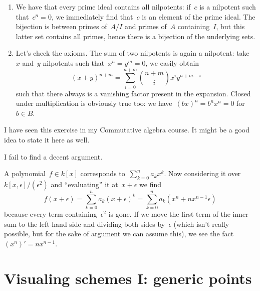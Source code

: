 \begin{exercise}
  \label{exercise:42o}
  \begin{enumerate}
    \item We have that every prime ideal contains all nilpotents: if~$c$ is a nilpotent such that~$c^n=0$, we immediately find that~$c$ is an element of the prime ideal. The bijection is between primes of~$A/I$ and primes of~$A$ containing~$I$, but this latter set contains all primes, hence there is a bijection of the underlying sets.

    \item\label{enumerate:42o-b} Let's check the axioms. The sum of two nilpotents is again a nilpotent: take~$x$ and~$y$ nilpotents such that~$x^n=y^m=0$, we easily obtain
      \begin{equation}
        (x+y)^{n+m}=\sum_{i=0}^{n+m}\binom{n+m}{i}x^iy^{n+m-i}
      \end{equation}
      such that there always is a vanishing factor present in the expansion. Closed under multiplication is obviously true too: we have~$(bx)^n=b^nx^n=0$ for~$b\in B$.
  \end{enumerate}
\end{exercise}

\begin{exercise} %
  I have seen this exercise in my Commutative algebra course. It might be a good idea to state it here as well.
\end{exercise}

\begin{exercise} %
  I fail to find a decent argument.
\end{exercise}

\begin{exercise}
  A polynomial~$f\in k[x]$ corresponds to~$\sum_{k=0}^na_kx^k$. Now considering it over~$k[x,\epsilon]/(\epsilon^2)$ and ``evaluating'' it at~$x+\epsilon$ we find
  \begin{equation}
    f(x+\epsilon)=\sum_{k=0}^na_k(x+\epsilon)^k=\sum_{k=0}^na_k\left( x^n+nx^{n-1}\epsilon \right)
  \end{equation}
  because every term containing~$\epsilon^2$ is gone. If we move the first term of the inner sum to the left-hand side and dividing both sides by~$\epsilon$ (which isn't really possible, but for the sake of argument we can assume this), we see the fact~$(x^n)'=nx^{n-1}$.
\end{exercise}


\section{Visualing schemes I: generic points}

